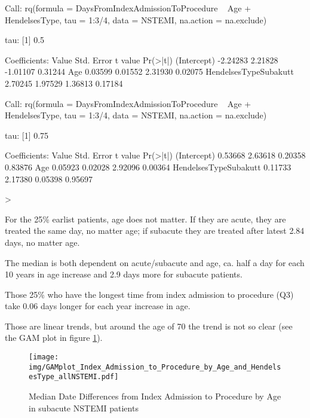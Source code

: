 \documentclass[a4paper]{report}
\begin{document}
\begin{itemize}
{\begin{Schunk}
\begin{Soutput}
Call: rq(formula = DaysFromIndexAdmissionToProcedure ~ Age + HendelsesType, 
    tau = 1:3/4, data = NSTEMI, na.action = na.exclude)

tau: [1] 0.5

Coefficients:
                      Value    Std. Error t value  Pr(>|t|)
(Intercept)           -2.24283  2.21828   -1.01107  0.31244
Age                    0.03599  0.01552    2.31930  0.02075
HendelsesTypeSubakutt  2.70245  1.97529    1.36813  0.17184

Call: rq(formula = DaysFromIndexAdmissionToProcedure ~ Age + HendelsesType, 
    tau = 1:3/4, data = NSTEMI, na.action = na.exclude)

tau: [1] 0.75

Coefficients:
                      Value   Std. Error t value Pr(>|t|)
(Intercept)           0.53668 2.63618    0.20358 0.83876 
Age                   0.05923 0.02028    2.92096 0.00364 
HendelsesTypeSubakutt 0.11733 2.17380    0.05398 0.95697 
\end{Soutput}
\begin{Sinput}
> 
\end{Sinput}
\end{Schunk}
For the 25\% earlist patients, age does not matter. If they are acute, they are treated the same day, no matter age; if subacute they are treated after latest 2.84 days, no matter age.

The median is both dependent on acute/subacute and age, ca. half a day for each 10 years in age increase and 2.9 days more for subacute patients.

Those 25\% who have the longest time from index admission to procedure (Q3) take 0.06 days longer for each year increase in age.

Those are linear trends, but around the age of 70 the trend is not so clear (see the GAM plot in figure \ref{GAMplot: Median Date Differences from Index Admission to Procedure by Age allNSTEMI}).


\begin{figure}
  \centering
  \caption{Median Date Differences from Index Admission to Procedure by Age in subacute NSTEMI patients}
  \label{GAMplot: Median Date Differences from Index Admission to Procedure by Age allNSTEMI}
\texttt{[image: img/GAMplot\_Index\_Admission\_to\_Procedure\_by\_Age\_and\_HendelsesType\_allNSTEMI.pdf]}\end{figure}






}
\end{itemize}
\end{document}
